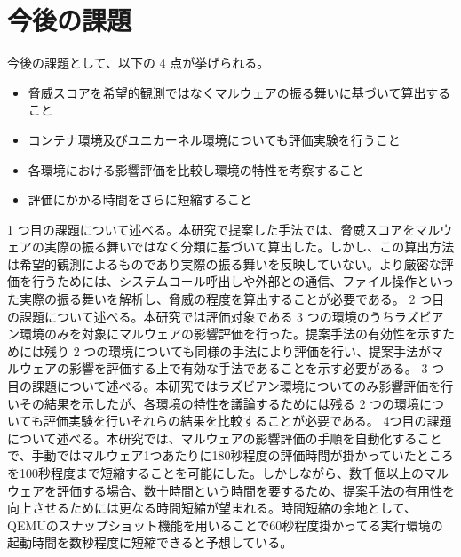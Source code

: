 \documentclass[12pt,a4paper,titlepage,report]{jsbook}
\begin{document}
\section{今後の課題}
今後の課題として、以下の 4 点が挙げられる。

\begin{itemize}
	\item 脅威スコアを希望的観測ではなくマルウェアの振る舞いに基づいて算出すること
	\item コンテナ環境及びユニカーネル環境についても評価実験を行うこと
	\item 各環境における影響評価を比較し環境の特性を考察すること
	\item 評価にかかる時間をさらに短縮すること
\end{itemize}

1 つ目の課題について述べる。本研究で提案した手法では、脅威スコアをマルウェアの実際の振る舞いではなく分類に基づいて算出した。しかし、この算出方法は希望的観測によるものであり実際の振る舞いを反映していない。より厳密な評価を行うためには、システムコール呼出しや外部との通信、ファイル操作といった実際の振る舞いを解析し、脅威の程度を算出することが必要である。  
2 つ目の課題について述べる。本研究では評価対象である 3 つの環境のうちラズビアン環境のみを対象にマルウェアの影響評価を行った。提案手法の有効性を示すためには残り 2 つの環境についても同様の手法により評価を行い、提案手法がマルウェアの影響を評価する上で有効な手法であることを示す必要がある。
3 つ目の課題について述べる。本研究ではラズビアン環境についてのみ影響評価を行いその結果を示したが、各環境の特性を議論するためには残る 2 つの環境についても評価実験を行いそれらの結果を比較することが必要である。
4つ目の課題について述べる。本研究では、マルウェアの影響評価の手順を自動化することで、手動ではマルウェア1つあたりに180秒程度の評価時間が掛かっていたところを100秒程度まで短縮することを可能にした。しかしながら、数千個以上のマルウェアを評価する場合、数十時間という時間を要するため、提案手法の有用性を向上させるためには更なる時間短縮が望まれる。時間短縮の余地として、QEMUのスナップショット機能を用いることで60秒程度掛かってる実行環境の起動時間を数秒程度に短縮できると予想している。



\end{document}
